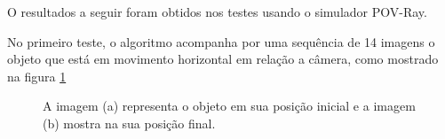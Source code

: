 O resultados a seguir foram obtidos nos testes usando o simulador POV-Ray.

No primeiro teste, o algoritmo acompanha por uma sequência de 14 imagens 
o objeto que está em movimento horizontal em relação a câmera, como mostrado na figura \ref{fig:imgpapercerta}

\begin{figure}[H]
\centering
  \caption{A imagem (a) representa o objeto em sua posição inicial  
   e a imagem (b) mostra na sua posição final.}
  \label{fig:imgpapercerta}
\end{figure}

